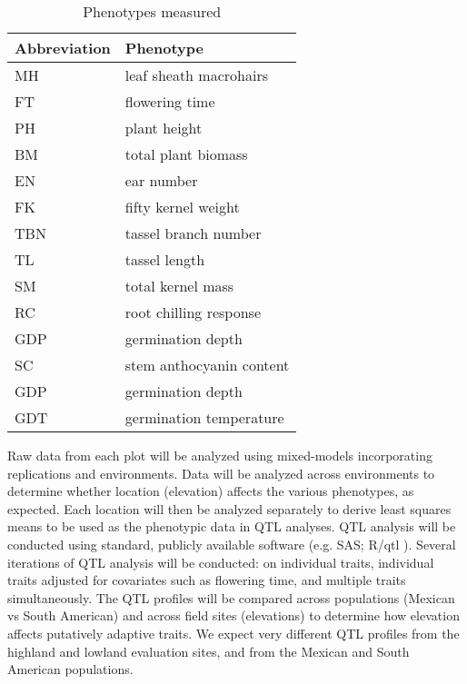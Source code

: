 \begin{wraptable}{r}{8cm}
\caption{Phenotypes measured}\label{phenos}
\begin{tabular}{ll}\\\toprule  
{\bf Abbreviation} & {\bf Phenotype}  \\\midrule
MH & leaf sheath macrohairs \\
FT & flowering time \\
PH & plant height \\
BM & total plant biomass \\
EN & ear number \\
FK & fifty kernel weight \\
TBN & tassel branch number \\
TL & tassel length \\
SM & total kernel mass \\
RC & root chilling response \\
GDP & germination depth \\
SC & stem anthocyanin content \\
GDP & germination depth \\
GDT & germination temperature \\\bottomrule
\end{tabular}
\end{wraptable} 

Raw data from each plot will be analyzed using mixed-models incorporating replications and environments.  Data will be analyzed across environments to determine whether location (elevation) affects the various phenotypes, as expected.  Each location will then be analyzed separately to derive least squares means to be used as the phenotypic data in QTL analyses.  QTL analysis will be conducted using standard, publicly available software (e.g. SAS; R/qtl \citealp{Broman2003a}).  Several iterations of QTL analysis will be conducted: on individual traits, individual traits adjusted for covariates such as flowering time, and multiple traits simultaneously.  The QTL profiles will be compared across populations (Mexican vs South American) and across field sites (elevations) to determine how elevation affects putatively adaptive traits.  We expect very different QTL profiles from the highland and lowland evaluation sites, and from the Mexican and South American populations.


